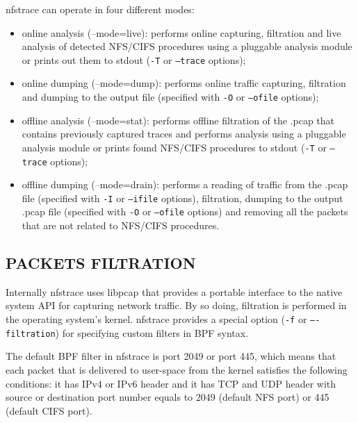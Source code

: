 \documentclass{article}
\newcommand*{\textfile}[1]{\textsf{#1}}
\newcommand*{\textprog}[1]{\textfile{#1}}
\newcommand{\code}[1]{\texttt{#1}}
\begin{document}
\begin{minipage}[t]{\linewidth}
\textprog{nfstrace} can operate in four different modes:
\vspace{5mm}
\begin{itemize}
\item online analysis (\textprog{--mode=live}): performs online capturing,
    filtration and live analysis of detected NFS/CIFS procedures using a
    pluggable analysis module or prints out them to stdout (\code{-T} or
    \code{--trace} options); \item online dumping (\textprog{--mode=dump}):
    performs online traffic capturing, filtration and dumping to the output
    file (specified with \code{-O} or \code{--ofile} options); 
\item offline analysis (\textprog{--mode=stat}):
    performs offline filtration of the .pcap that contains previously captured
    traces and performs analysis using a pluggable analysis module or prints
    found NFS/CIFS procedures to stdout (\code{-T} or \code{–trace} options); 
\item offline dumping (\textprog{--mode=drain}): performs a reading of traffic
    from the .pcap file (specified with \code{-I} or \code{--ifile} options),
    filtration, dumping to the output .pcap file (specified with \code{-O} or
    \code{--ofile} options) and removing all the packets that are not related
    to NFS/CIFS procedures.  \end{itemize}
\end{minipage}

\subsection{PACKETS FILTRATION}

Internally \textprog{nfstrace} uses libpcap that provides a portable interface to
the native system API for capturing network traffic. By so doing, filtration is
performed in the operating system's kernel. \textprog{nfstrace} provides a special option
(\code{-f} or \code{–-filtration}) for specifying custom filters in \gls{BPF} syntax.

The default \gls{BPF} filter in \textprog{nfstrace} is \textprog{port 2049 or port
445}, which means that each packet that is delivered to user-space from the
kernel satisfies the following conditions: it has IPv4 or IPv6 header and it
has TCP and UDP header with source or destination port number equals to 2049
(default NFS port) or 445 (default \gls{CIFS} port).
\end{document}
